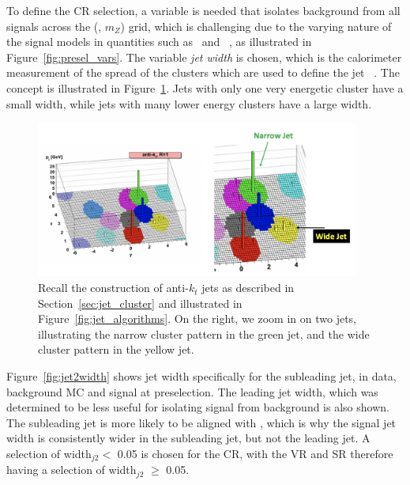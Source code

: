 To define the CR selection, a variable is needed that isolates background from all signals across the (\rinv, $m_Z$) grid, which is challenging due to the varying nature of the signal models in quantities such as \met~and \pt~, as illustrated in Figure~\ref{fig:presel_vars}. 
The variable \textit{jet width} is chosen, which is the calorimeter measurement of the spread of the clusters which are used to define the jet ~\cite{jetwidth}.
The concept is illustrated in Figure~\ref{fig:jet2_calo}.
Jets with only one very energetic cluster have a small width, while jets with many lower energy clusters have a large width.
\begin{figure}[!htbp]
\centering
   \includegraphics[width=0.95\textwidth]{figures/eventsel/jet2_calo}
    \caption{Recall the construction of anti-$k_t$ jets as described in Section~\ref{sec:jet_cluster} and illustrated in Figure~\ref{fig:jet_algorithms}. On the right, we zoom in on two jets, illustrating the narrow cluster pattern in the green jet, and the wide cluster pattern in the yellow jet.
    \label{fig:jet2_calo}}
\end{figure}

Figure~\ref{fig:jet2width} shows jet width specifically for the subleading jet, in data, background MC and signal at preselection.
The leading jet width, which was determined to be less useful for isolating signal from background is also shown.
The subleading jet is more likely to be aligned with \met, which is why the signal jet width is consistently wider in the subleading jet, but not the leading jet.  %
A selection of width$_{j2} <$ 0.05 is chosen for the CR, with the VR and SR therefore having a selection of width$_{j2}$ $\geq$ 0.05.
 

